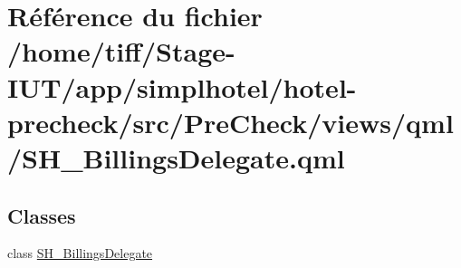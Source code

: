 \hypertarget{SH__BillingsDelegate_8qml}{\section{Référence du fichier /home/tiff/\-Stage-\/\-I\-U\-T/app/simplhotel/hotel-\/precheck/src/\-Pre\-Check/views/qml/\-S\-H\-\_\-\-Billings\-Delegate.qml}
\label{SH__BillingsDelegate_8qml}
}
\subsection*{Classes}
\begin{DoxyCompactItemize}
\item 
class \hyperlink{classSH__BillingsDelegate}{S\-H\-\_\-\-Billings\-Delegate}
\end{DoxyCompactItemize}
